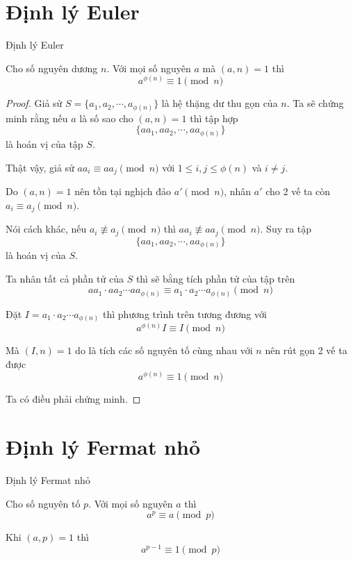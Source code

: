 \section{Định lý Euler}

\begin{theoremblock}{Định lý Euler}
    
    Cho số nguyên dương $n$. Với mọi số nguyên $a$ mà $(a, n) = 1$ thì $$a^{\phi(n)} \equiv 1 \pmod n$$
\end{theoremblock}

\begin{proof}
    Giả sử $S = \{a_1, a_2, \cdots, a_{\phi(n)}\}$ là hệ thặng dư thu gọn của $n$. Ta sẽ chứng minh rằng nếu $a$ là số sao cho $(a, n)=1$ thì tập hợp
    $$\{a a_1, a a_2, \cdots, a a_{\phi(n)}\}$$ là hoán vị của tập $S$.

    Thật vậy, giả sử $a a_i \equiv a a_j \pmod n$ với $1 \leq i, j \leq \phi(n)$ và $i \neq j$.

    Do $(a, n) = 1$ nên tồn tại nghịch đảo $a' \pmod n$, nhân $a'$ cho 2 vế ta còn $a_i \equiv a_j \pmod n$.

    Nói cách khác, nếu $a_i \not\equiv a_j \pmod n$ thì $a a_i \not\equiv a a_j \pmod n$. Suy ra tập
    $$\{a a_1, a a_2, \cdots, a a_{\phi(n)}\}$$ là hoán vị của $S$.

    Ta nhân tất cả phần tử của $S$ thì sẽ bằng tích phần tử của tập trên
    $$a a_1 \cdot a a_2 \cdots a a_{\phi(n)} \equiv a_1 \cdot a_2 \cdots a_{\phi(n)} \pmod n$$

    Đặt $I = a_1 \cdot a_2 \cdots a_{\phi(n)}$ thì phương trình trên tương đương với 
    $$a^{\phi(n)} I \equiv I \pmod n$$
    
    Mà $(I, n) = 1$ do là tích các số nguyên tố cùng nhau với $n$ nên rút gọn 2 vế ta được
    $$a^{\phi(n)} \equiv 1 \pmod n$$

    Ta có điều phải chứng minh.
\end{proof}

\section{Định lý Fermat nhỏ}

\begin{theoremblock}{Định lý Fermat nhỏ}
    
    Cho số nguyên tố $p$. Với mọi số nguyên $a$ thì $$a^p \equiv a \pmod p$$

    Khi $(a, p) = 1$ thì $$a^{p-1} \equiv 1 \pmod p$$
\end{theoremblock}

